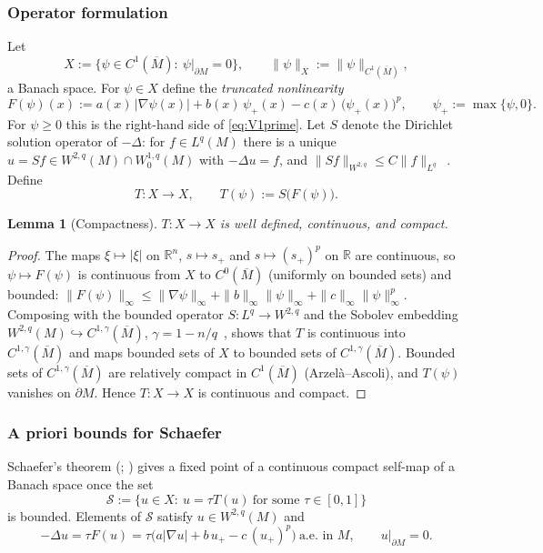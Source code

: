 \documentclass[11pt]{article}
\theoremstyle{plain}
\newtheorem{lemma}[theorem]{Lemma}
\theoremstyle{definition}
\theoremstyle{remark}
\newcommand{\R}{\mathbb{R}}
\begin{document}
\subsubsection*{Operator formulation}
Let
\[
X:=\{\psi\in C^1(\overline M):\ \psi|_{\partial M}=0\},\qquad \|\psi\|_X:=\|\psi\|_{C^1(\overline M)},
\]
a Banach space. For \(\psi\in X\) define the \emph{truncated nonlinearity}
\[
F(\psi)(x):=a(x)\,|\nabla\psi(x)|+b(x)\,\psi_+(x)-c(x)\,\big(\psi_+(x)\big)^p,\qquad \psi_+:=\max\{\psi,0\}.
\]
For \(\psi\ge 0\) this is the right-hand side of \eqref{eq:V1prime}. Let \(S\) denote the Dirichlet solution operator of \(-\Delta\): for \(f\in L^q(M)\) there is a unique \(u=Sf\in W^{2,q}(M)\cap W^{1,q}_0(M)\) with \(-\Delta u=f\), and \(\|Sf\|_{W^{2,q}}\le C\|f\|_{L^q}\)~\cite[Thm.~9.15, Lem.~9.17]{GilbargTrudinger2001}. Define
\[
T:X\to X,\qquad T(\psi):=S\big(F(\psi)\big).
\]

\begin{lemma}[Compactness]\label{lem:TcompactV1prime}
\(T:X\to X\) is well defined, continuous, and compact.
\end{lemma}
\begin{proof}
The maps \(\xi\mapsto|\xi|\) on \(\R^n\), \(s\mapsto s_+\) and \(s\mapsto (s_+)^p\) on \(\R\) are continuous, so \(\psi\mapsto F(\psi)\) is continuous from \(X\) to \(C^0(\overline M)\) (uniformly on bounded sets) and bounded: \(\|F(\psi)\|_{\infty}\le\|\nabla\psi\|_\infty+\|b\|_\infty\|\psi\|_\infty+\|c\|_\infty\|\psi\|_\infty^p\). Composing with the bounded operator \(S:L^q\to W^{2,q}\) and the Sobolev embedding \(W^{2,q}(M)\hookrightarrow C^{1,\gamma}(\overline M)\), \(\gamma=1-n/q\)~\cite[Thm.~7.26]{GilbargTrudinger2001}, shows that \(T\) is continuous into \(C^{1,\gamma}(\overline M)\) and maps bounded sets of \(X\) to bounded sets of \(C^{1,\gamma}(\overline M)\). Bounded sets of \(C^{1,\gamma}(\overline M)\) are relatively compact in \(C^1(\overline M)\) (Arzel\`a--Ascoli), and \(T(\psi)\) vanishes on \(\partial M\). Hence \(T:X\to X\) is continuous and compact.
\end{proof}

\subsubsection*{A priori bounds for Schaefer}
Schaefer's theorem (\cite[\S9.2.2, Thm.~4]{Evans2010}; \cite{Schaefer1955,Deimling1985}) gives a fixed point of a continuous compact self-map of a Banach space once the set
\[
\mathcal S:=\{u\in X:\ u=\tau T(u)\ \text{for some }\tau\in[0,1]\}
\]
is bounded. Elements of \(\mathcal S\) satisfy \(u\in W^{2,q}(M)\) and
\begin{equation}\label{eq:schaeferEq}
-\Delta u=\tau F(u)=\tau\Big(a|\nabla u|+b\,u_+-c\,(u_+)^p\Big)\ \text{a.e. in }M,\qquad u|_{\partial M}=0 .
\end{equation}
\end{document}
